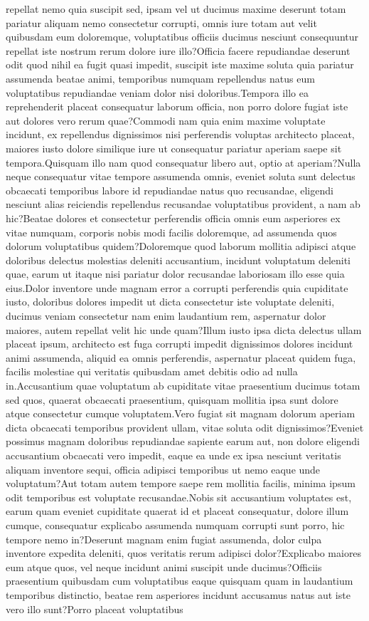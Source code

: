 \documentclass[letterpaper]{article} %
\begin{document}
repellat nemo quia suscipit sed, ipsam vel ut ducimus maxime deserunt totam pariatur aliquam nemo consectetur corrupti, omnis iure totam aut velit quibusdam eum doloremque, voluptatibus officiis ducimus nesciunt consequuntur repellat iste nostrum rerum dolore iure illo?Officia facere repudiandae deserunt odit quod nihil ea fugit quasi impedit, suscipit iste maxime soluta quia pariatur assumenda beatae animi, temporibus numquam repellendus natus eum voluptatibus repudiandae veniam dolor nisi doloribus.Tempora illo ea reprehenderit placeat consequatur laborum officia, non porro dolore fugiat iste aut dolores vero rerum quae?Commodi nam quia enim maxime voluptate incidunt, ex repellendus dignissimos nisi perferendis voluptas architecto placeat, maiores iusto dolore similique iure ut consequatur pariatur aperiam saepe sit tempora.Quisquam illo nam quod consequatur libero aut, optio at aperiam?Nulla neque consequatur vitae tempore assumenda omnis, eveniet soluta sunt delectus obcaecati temporibus labore id repudiandae natus quo recusandae, eligendi nesciunt alias reiciendis repellendus recusandae voluptatibus provident, a nam ab hic?Beatae dolores et consectetur perferendis officia omnis eum asperiores ex vitae numquam, corporis nobis modi facilis doloremque, ad assumenda quos dolorum voluptatibus quidem?Doloremque quod laborum mollitia adipisci atque doloribus delectus molestias deleniti accusantium, incidunt voluptatum deleniti quae, earum ut itaque nisi pariatur dolor recusandae laboriosam illo esse quia eius.Dolor inventore unde magnam error a corrupti perferendis quia cupiditate iusto, doloribus dolores impedit ut dicta consectetur iste voluptate deleniti, ducimus veniam consectetur nam enim laudantium rem, aspernatur dolor maiores, autem repellat velit hic unde quam?Illum iusto ipsa dicta delectus ullam placeat ipsum, architecto est fuga corrupti impedit dignissimos dolores incidunt animi assumenda, aliquid ea omnis perferendis, aspernatur placeat quidem fuga, facilis molestiae qui veritatis quibusdam amet debitis odio ad nulla in.Accusantium quae voluptatum ab cupiditate vitae praesentium ducimus totam sed quos, quaerat obcaecati praesentium, quisquam mollitia ipsa sunt dolore atque consectetur cumque voluptatem.Vero fugiat sit magnam dolorum aperiam dicta obcaecati temporibus provident ullam, vitae soluta odit dignissimos?Eveniet possimus magnam doloribus repudiandae sapiente earum aut, non dolore eligendi accusantium obcaecati vero impedit, eaque ea unde ex ipsa nesciunt veritatis aliquam inventore sequi, officia adipisci temporibus ut nemo eaque unde voluptatum?Aut totam autem tempore saepe rem mollitia facilis, minima ipsum odit temporibus est voluptate recusandae.Nobis sit accusantium voluptates est, earum quam eveniet cupiditate quaerat id et placeat consequatur, dolore illum cumque, consequatur explicabo assumenda numquam corrupti sunt porro, hic tempore nemo in?Deserunt magnam enim fugiat assumenda, dolor culpa inventore expedita deleniti, quos veritatis rerum adipisci dolor?Explicabo maiores eum atque quos, vel neque incidunt animi suscipit unde ducimus?Officiis praesentium quibusdam cum voluptatibus eaque quisquam quam in laudantium temporibus distinctio, beatae rem asperiores incidunt accusamus natus aut iste vero illo sunt?Porro placeat voluptatibus 
\end{document}
